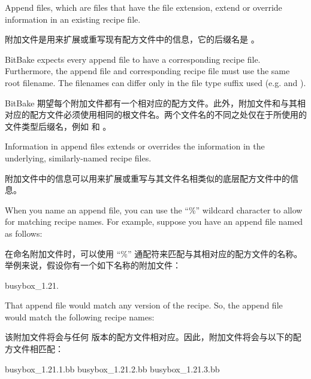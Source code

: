 
Append files, which are files that have the  file extension, extend or override information in an existing recipe file.

附加文件是用来扩展或重写现有配方文件中的信息，它的后缀名是 。

BitBake expects every append file to have a corresponding recipe file. Furthermore, the append file and corresponding recipe file must use the same root filename. The filenames can differ only in the file type suffix used (e.g.  and ).

BitBake 期望每个附加文件都有一个相对应的配方文件。此外，附加文件和与其相对应的配方文件必须使用相同的根文件名。两个文件名的不同之处仅在于所使用的文件类型后缀名，例如  和 。

Information in append files extends or overrides the information in the underlying, similarly-named recipe files.

附加文件中的信息可以用来扩展或重写与其文件名相类似的底层配方文件中的信息。

When you name an append file, you can use the ``\%'' wildcard character to allow for matching recipe names. For example, suppose you have an append file named as follows:

在命名附加文件时，可以使用 ``\%'' 通配符来匹配与其相对应的配方文件的名称。举例来说，假设你有一个如下名称的附加文件：

\begin{pyglist}
busybox_1.21.%
\end{pyglist}

That append file would match any  version of the recipe. So, the append file would match the following recipe names:

该附加文件将会与任何  版本的配方文件相对应。因此，附加文件将会与以下的配方文件相匹配：

\begin{pyglist}
busybox_1.21.1.bb
busybox_1.21.2.bb
busybox_1.21.3.bb
\end{pyglist}


